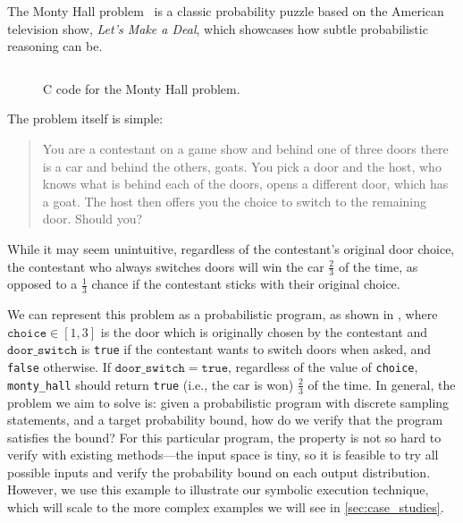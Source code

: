 \documentclass[acmsmall,review,anonymous]{acmart}\settopmatter{printfolios=true,printccs=false,printacmref=false}
\begin{document}
The Monty Hall problem~\citep{selvin1975} is a classic probability puzzle based on the American television show, \textit{Let's Make a Deal}, which showcases how subtle probabilistic reasoning can be.
% 
\begin{wrapfigure}[27]{r}{0.5\textwidth}
  \centering
  \vspace{-1em}
	\inputminted[numbersep=3pt,xleftmargin=10pt,tabsize=2,fontsize=\footnotesize,linenos,escapeinside=||]{c}{montyhall.c}
	\caption{C code for the Monty Hall problem.}
	\label{fig:montyhall}
\end{wrapfigure}
The problem itself is simple:
\begingroup
\addtolength\leftmargini{-0.21in}
\begin{quote}
	You are a contestant on a game show and behind one of three doors there is a car and behind the others, goats.
	You pick a door and the host, who knows what is behind each of the doors, opens a different door, which has a goat.
	The host then offers you the choice to switch to the remaining door.
	Should you?
\end{quote}
\endgroup
\noindent{}While it may seem unintuitive, regardless of the contestant's original door choice, the contestant who always switches doors will win the car $\frac{2}{3}$ of the time, as opposed to a $\frac{1}{3}$ chance if the contestant sticks with their original choice.

We can represent this problem as a probabilistic program, as shown in , where $\mathtt{choice} \in [1,3]$ is the door which is originally chosen by the contestant and $\mathtt{door\_switch}$ is \texttt{true} if the contestant wants to switch doors when asked, and \texttt{false} otherwise.
% 
If $\mathtt{door\_switch} = \mathtt{true}$, regardless of the value of \texttt{choice}, \texttt{monty\_hall} should return \texttt{true} (i.e., the car is won) $\frac{2}{3}$ of the time.
% 
In general, the problem we aim to solve is: given a probabilistic program with discrete sampling statements, and a target probability bound, how do we verify that the program satisfies the bound?
% 
For this particular program, the property is not so hard to verify with existing
methods---the input space is tiny, so it
is feasible to try all possible inputs and verify the probability bound on each
output distribution. However, we use this example to illustrate our symbolic
execution technique, which will scale to the more complex examples we will see
in \cref{sec:case_studies}.
\end{document}
